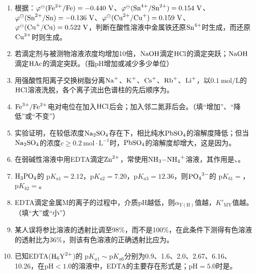 \begin{enumerate}[label=\arabic*., itemsep=1.5ex]
    \item 根据：$\varphi^\ominus(\ce{Fe^{2+}/Fe})=-0.440\ \mathrm{V}$、$\varphi^\ominus(\ce{Sn^{4+}/Sn^{2+}})=0.154\ \mathrm{V}$、$\varphi^\ominus(\ce{Sn^{2+}/Sn})=-0.136\ \mathrm{V}$、$\varphi^\ominus(\ce{Cu^{2+}/Cu^{+}})=0.159\ \mathrm{V}$、$\varphi^\ominus(\ce{Cu^{+}/Cu})=0.522\ \mathrm{V}$，判断在酸性溶液中金属铁还原$\ce{Sn^{4+}}$时生成\underline{\qquad\qquad}，而还原$\ce{Cu^{2+}}$时则生成\underline{\qquad\qquad}。
    \item 若滴定剂与被测物溶液浓度均增加10倍，$\ce{NaOH}$滴定$\ce{HCl}$的滴定突跃\underline{\qquad\qquad}；$\ce{NaOH}$滴定$\ce{HAc}$的滴定突跃\underline{\qquad\qquad}。（指pH增加或减少多少单位）
    \item 用强酸性阳离子交换树脂分离$\ce{Na+}$、$\ce{K+}$、$\ce{Cs+}$、$\ce{Rb+}$、$\ce{Li+}$，以$0.1\ \mathrm{mol/L}$的$\ce{HCl}$溶液洗脱，各个离子流出色谱柱的先后顺序为\underline{\qquad\qquad}。
    \item $\ce{Fe^{3+}/Fe^{2+}}$电对电位在加入$\ce{HCl}$后会\underline{\qquad\qquad}；加入邻二氮菲后会\underline{\qquad\qquad}。（填“增加”、“降低”或“不变”）
    \item 实验证明，在较低浓度$\ce{Na2SO4}$存在下，相比纯水$\ce{PbSO4}$的溶解度降低；但当$\ce{Na2SO4}$的浓度$c\ge0.2\ \mathrm{mol\cdot L^{-1}}$时，$\ce{PbSO4}$的溶解度却增大，这是因为\underline{\qquad\qquad}。
    \item 在弱碱性溶液中用EDTA滴定$\ce{Zn^{2+}}$，常使用$\ce{NH3-NH4+}$溶液，其作用是\underline{\qquad\qquad}、\underline{\qquad\qquad}。
    \item $\ce{H3PO4}$的 $\text{p}K_{a1}=2.12$，$\text{p}K_{a2}=7.20$，$\text{p}K_{a3}=12.36$，则$\ce{PO4^{3-}}$的 $\text{p}K_{b1}=$\underline{\qquad\qquad}，$\text{p}K_{b2}=$\underline{\qquad\qquad}。
    \item EDTA滴定金属M的离子的过程中，介质pH越低，则$\alpha_{Y(\text{H})}$值越\underline{\qquad\qquad}，$K'_{\text{MY}}$值越\underline{\qquad\qquad}。（填“大”或“小”）
    \item 某人误将参比溶液的透射比调至98\%，而不是100\%，在此条件下测得有色溶液的透射比为36\%，则该有色溶液的正确透射比应为\underline{\qquad\qquad}。
    \item 已知EDTA($\ce{H6Y^{2+}}$)的 $\text{p}K_{a1}\sim\text{p}K_{a6}$分别为0.9、1.6、2.0、2.67、6.16、10.26，在$\text{pH}<1.0$的溶液中，EDTA的主要存在形式是\underline{\qquad\qquad}；$\text{pH}=5.0$时是\underline{\qquad\qquad}。
\end{enumerate}

